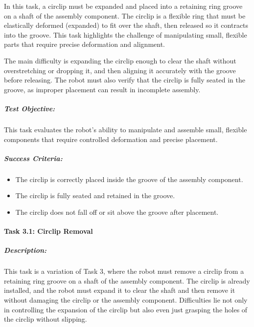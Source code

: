 \documentclass[letterpaper,10pt,english]{sphinxmanual}
\begin{document}
\sphinxAtStartPar
In this task, a circlip must be expanded and placed into a retaining ring groove on a shaft of the assembly component.
The circlip is a flexible ring that must be elastically deformed (expanded) to fit over the shaft, then released so it contracts into the groove.
This task highlights the challenge of manipulating small, flexible parts that require precise deformation and alignment.

\sphinxAtStartPar
The main difficulty is expanding the circlip enough to clear the shaft without overstretching or dropping it, and then aligning it accurately with the groove before releasing.
The robot must also verify that the circlip is fully seated in the groove, as improper placement can result in incomplete assembly.


\subparagraph{Test Objective:}
\label{\detokenize{robotic_instructions_elastic_deformation:id5}}
\sphinxAtStartPar
This task evaluates the robot’s ability to manipulate and assemble small, flexible components that require controlled deformation and precise placement.


\subparagraph{Success Criteria:}
\label{\detokenize{robotic_instructions_elastic_deformation:id6}}\begin{itemize}
\item {} 
\sphinxAtStartPar
The circlip is correctly placed inside the groove of the assembly component.

\item {} 
\sphinxAtStartPar
The circlip is fully seated and retained in the groove.

\item {} 
\sphinxAtStartPar
The circlip does not fall off or sit above the groove after placement.

\end{itemize}


\paragraph{Task 3.1: Circlip Removal}
\label{\detokenize{robotic_instructions_elastic_deformation:task-3-1-circlip-removal}}

\subparagraph{Description:}
\label{\detokenize{robotic_instructions_elastic_deformation:id7}}
\sphinxAtStartPar
This task is a variation of Task 3, where the robot must remove a circlip from a retaining ring groove on a shaft of the assembly component.
The circlip is already installed, and the robot must expand it to clear the shaft and then remove it without damaging the circlip or the assembly component.
Difficulties lie not only in controlling the expansion of the circlip but also even just grasping the holes of the circlip without slipping.
\end{document}
